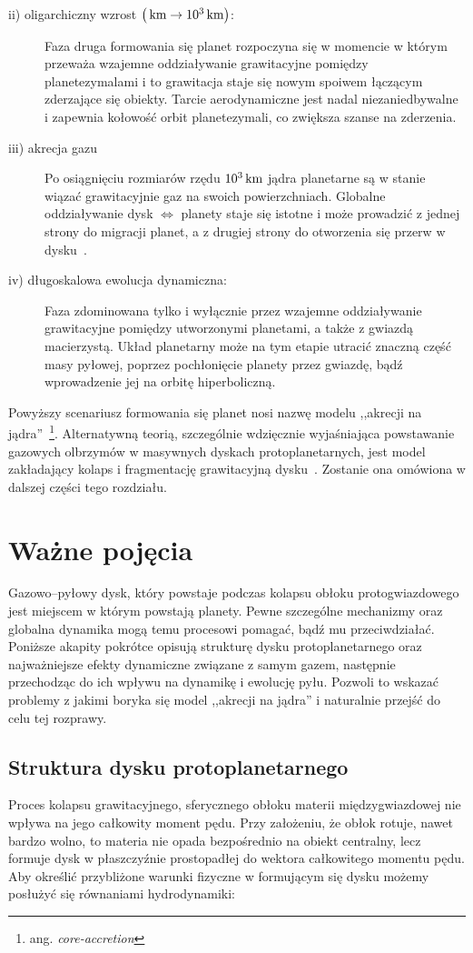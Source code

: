 \begin{description}
\item[ii) oligarchiczny wzrost $\left(\hbox{$\thinspace\textrm{km}$} \rightarrow
   10^3\hbox{$\thinspace\textrm{km}$}\right)$:]
   Faza druga formowania się planet rozpoczyna się w momencie w którym przeważa
   wzajemne oddziaływanie grawitacyjne pomiędzy planetezymalami i to grawitacja
   staje się nowym spoiwem łączącym zderzające się obiekty. Tarcie
   aerodynamiczne jest nadal niezaniedbywalne i zapewnia kołowość orbit
   planetezymali, co zwiększa szanse na zderzenia.
\item[iii) akrecja gazu]
   Po osiągnięciu rozmiarów rzędu $10^3\hbox{$\thinspace\textrm{km}$}$ jądra planetarne
   są w stanie wiązać grawitacyjnie gaz na swoich powierzchniach. Globalne
   oddziaływanie dysk $\iff$ planety staje się istotne i może prowadzić z jednej
   strony do migracji planet, a z drugiej strony do otworzenia się przerw w
   dysku~\citep{KKI06}.
\item[iv) długoskalowa ewolucja dynamiczna:]
   Faza zdominowana tylko i wyłącznie przez wzajemne oddziaływanie grawitacyjne
   pomiędzy utworzonymi planetami, a także z gwiazdą macierzystą. Układ
   planetarny może na tym etapie utracić znaczną część masy pyłowej, poprzez
   pochłonięcie planety przez gwiazdę, bądź wprowadzenie jej na orbitę
   hiperboliczną.
\end{description}
Powyższy scenariusz formowania się planet nosi nazwę modelu ,,akrecji na
jądra''~\footnote{ang. \emph{core-accretion}}. Alternatywną teorią, szczególnie
wdzięcznie wyjaśniająca powstawanie gazowych olbrzymów w masywnych dyskach
protoplanetarnych, jest model zakładający kolaps i fragmentację grawitacyjną
dysku~\cite{Boss97}. Zostanie ona omówiona w dalszej części tego rozdziału.

\section{Ważne pojęcia}
Gazowo--pyłowy dysk, który powstaje podczas kolapsu obłoku protogwiazdowego jest
miejscem w którym powstają planety. Pewne szczególne mechanizmy oraz globalna
dynamika mogą temu procesowi pomagać, bądź mu przeciwdziałać. Poniższe akapity
pokrótce opisują strukturę dysku protoplanetarnego oraz najważniejsze efekty
dynamiczne związane z samym gazem, następnie przechodząc do ich wpływu na
dynamikę i ewolucję pyłu. Pozwoli to wskazać problemy z jakimi boryka się model
,,akrecji na jądra'' i naturalnie przejść do celu tej rozprawy.

\subsection{Struktura dysku protoplanetarnego}
Proces kolapsu grawitacyjnego, sferycznego obłoku materii międzygwiazdowej nie
wpływa na jego całkowity moment pędu. Przy założeniu, że obłok rotuje, nawet
bardzo wolno, to materia nie opada bezpośrednio na obiekt
centralny, lecz formuje dysk w płaszczyźnie prostopadłej do wektora całkowitego
momentu pędu. Aby określić przybliżone warunki fizyczne w formującym się dysku
możemy posłużyć się równaniami hydrodynamiki:


